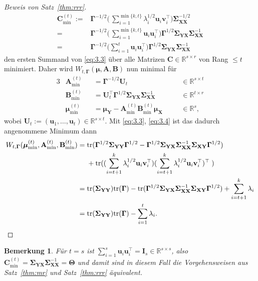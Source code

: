 \documentclass[]{article}
\newcommand{\R}{\mathbb{R}}
\newcommand{\X}{\mathbf{X}}
\newcommand{\Y}{\mathbf{Y}}
\newcommand{\T}{\mathbf{\Theta}}
\newcommand{\muu}{\bm{\mu}}
\newcommand{\Ssigma}{\mathbf{\Sigma}}
\newcommand{\vv}{\mathbf{v}}
\newcommand{\uu}{\mathbf{u}}
\newcommand{\C}{\mathbf{C}}
\newcommand{\A}{\mathbf{A}}
\newcommand{\B}{\mathbf{B}}
\newcommand{\Ggamma}{\mathbf{\Gamma}}
\newcommand{\tr}{\mathrm{tr}}
\newtheorem*{remark}{Bemerkung}
\begin{document}
\begin{proof}[Beweis von Satz~\ref{thm:rrr}]
\begin{align*}
		\C^{(t)}_{\min} :={}& \Ggamma^{-1/2} \biggl( \, \sum_{i=1}^{\min\{k, t\}} \lambda_i^{1/2} \uu_i \vv_i^\top \biggr) \Ssigma_{\X\X}^{-1/2} \\
		                 ={}& \Ggamma^{-1/2} \biggl( \, \sum_{i=1}^{\min\{k, t\}} \uu_i \uu_i^\top \biggr) \Ggamma^{1/2} \Ssigma_{\Y\X} \Ssigma_{\X\X}^{-1} \\
		                 ={}& \Ggamma^{-1/2} \biggl( \sum_{i=1}^{t} \uu_i \uu_i^\top \biggr) \Ggamma^{1/2} \Ssigma_{\Y\X} \Ssigma_{\X\X}^{-1}
	\end{align*}
	den ersten Summand von \eqref{eq:3.3} über alle Matrizen $\C \in \R^{s \times r}$ von Rang $\leq t$ minimiert.
	Daher wird $W_{t, \Ggamma}(\muu, \A, \B)$ nun minimal für
	\begin{alignat*}{3}
		&\A^{(t)}_{\min}   &&= \Ggamma^{-1/2} \mathbf{U}_t                                       &&\quad \in \R^{s \times t} \\
		&\B^{(t)}_{\min}   &&= \mathbf{U}_t^\top \Ggamma^{1/2} \Ssigma_{\Y\X}\Ssigma_{\X\X}^{-1} &&\quad \in \R^{t \times r} \\
		&\muu^{(t)}_{\min} &&= \muu_\Y - \A^{(t)}_{\min} \B^{(t)}_{\min} \muu_\X                 &&\quad \in \R^s \text{,}
	\end{alignat*}
	wobei $\mathbf{U}_t := (\uu_1,\dots, \uu_t) \in \R^{s \times t}$.
	Mit \eqref{eq:3.3}, \eqref{eq:3.4} ist das dadurch angenommene Minimum dann
	\begin{align*}
		W_{t, \Ggamma}(\muu^{(t)}_{\min}, \A^{(t)}_{\min}, \B^{(t)}_{\min}) ={}& \tr( \Ggamma^{1/2} \Ssigma_{\Y\Y} \Ggamma^{1/2} - \Ggamma^{1/2} \Ssigma_{\Y\X} \Ssigma_{\X\X}^{-1} \Ssigma_{\X\Y} \Ggamma^{1/2}) \\
																			   &+ \tr( (\sum_{i=t+1}^{k} \lambda_i^{1/2} \uu_i \vv_i^\top) (\sum_{i=t+1}^{k} \lambda_i^{1/2} \uu_i \vv_i^\top)^\top \; ) \\
																			={}& \tr(\Ssigma_{\Y\Y}) \tr(\Ggamma) - \tr(\Ggamma^{1/2} \Ssigma_{\Y\X} \Ssigma_{\X\X}^{-1} \Ssigma_{\X\Y} \Ggamma^{1/2}) + \sum_{i=t+1}^{k} \lambda_i \\
																			={}& \tr(\Ssigma_{\Y\Y}) \tr(\Ggamma) - \sum_{i=1}^{t} \lambda_i	\text{.} \qedhere										
	\end{align*}
\end{proof}

\begin{remark} 
		Für $t = s$ ist $\sum_{i=1}^{s} \uu_i \uu_i^\top = \mathbf{I}_s \in \R^{s \times s}$, also $\C^{(t)}_{\min} = \Ssigma_{\Y\X} \Ssigma_{\X\X}^{-1} = \T$ und damit sind in diesem Fall die Vorgehensweisen aus Satz~\ref{thm:mr} und Satz~\ref{thm:rrr} äquivalent.
\end{remark}
\end{document}
